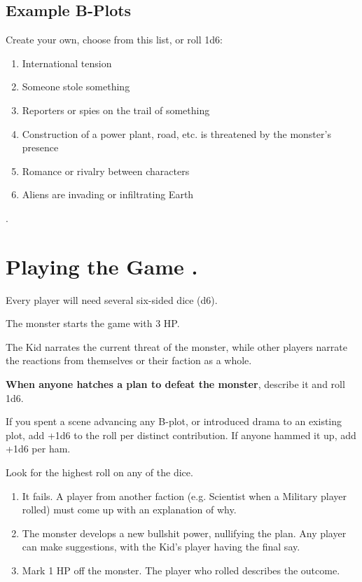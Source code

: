 \documentclass[10pt,oneside,letterpaper,landscape]{memoir}
\newcommand\rep{\leavevmode\xleaders\hbox{.}\hfill\kern0pt}
\begin{document}
\begin{multicols}{3}
\subsection{Example B-Plots}

Create your own, choose from this list, or roll 1d6:
\begin{enumerate}
	\item International tension
	\item Someone stole something
	\item Reporters or spies on the trail of something
	\item Construction of a power plant, road, etc. is threatened by the monster's presence
	\item Romance or rivalry between characters
	\item Aliens are invading or infiltrating Earth
\end{enumerate}

\columnbreak

{\color{white}.}
\vspace{18mm}

\section{Playing the Game \rep}

Every player will need several six-sided dice (d6).

The monster starts the game with 3 HP.

The Kid narrates the current threat of the monster, while other players narrate the reactions from themselves or their faction as a whole.

\textbf{When anyone hatches a plan to defeat the monster}, describe it and roll 1d6.

If you spent a scene advancing any B-plot, or introduced drama to an existing plot, add +1d6 to the roll per distinct contribution. If anyone hammed it up, add +1d6 per ham.

Look for the highest roll on any of the dice.

\begin{enumerate}
	\item [1-3:] It fails. A player from another faction (e.g. Scientist when a Military player rolled) must come up with an explanation of why.
	\item [4-5:] The monster develops a new bullshit power, nullifying the plan. Any player can make suggestions, with the Kid's player having the final say.
	\item [6:] Mark 1 HP off the monster. The player who rolled describes the outcome.
\end{enumerate}


\end{multicols}
\end{document}
